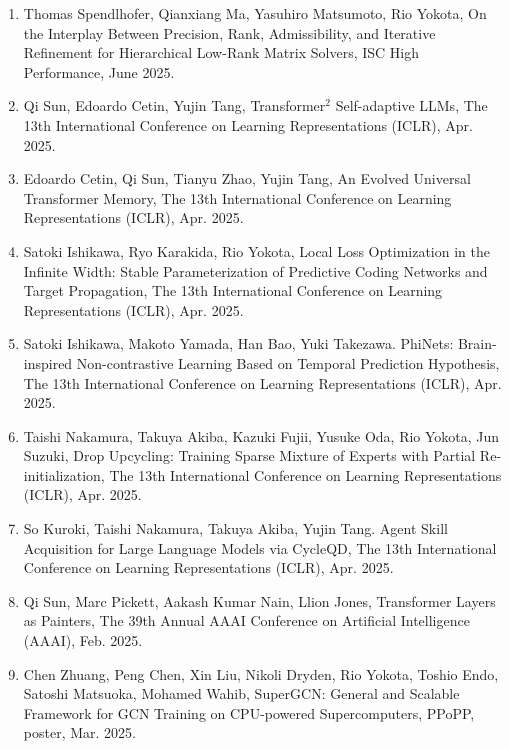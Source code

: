 \documentclass[margin,line]{cv}
\begin{document}
\begin{resume}
\begin{enumerate}
\item Thomas Spendlhofer, Qianxiang Ma, Yasuhiro Matsumoto, Rio Yokota, On the Interplay Between Precision, Rank, Admissibility, and Iterative Refinement for Hierarchical Low-Rank Matrix Solvers, ISC High Performance, June 2025.

\item Qi Sun, Edoardo Cetin, Yujin Tang, Transformer$^2$ Self-adaptive LLMs, The 13th International Conference on Learning Representations (ICLR), Apr. 2025.

\item Edoardo Cetin, Qi Sun, Tianyu Zhao, Yujin Tang, An Evolved Universal Transformer Memory, The 13th International Conference on Learning Representations (ICLR), Apr. 2025.

\item Satoki Ishikawa, Ryo Karakida, Rio Yokota, Local Loss Optimization in the Infinite Width: Stable Parameterization of Predictive Coding Networks and Target Propagation, The 13th International Conference on Learning Representations (ICLR), Apr. 2025.

\item Satoki Ishikawa, Makoto Yamada, Han Bao, Yuki Takezawa. PhiNets: Brain-inspired Non-contrastive Learning Based on Temporal Prediction Hypothesis, The 13th International Conference on Learning Representations (ICLR), Apr. 2025.

\item Taishi Nakamura, Takuya Akiba, Kazuki Fujii, Yusuke Oda, Rio Yokota, Jun Suzuki, Drop Upcycling: Training Sparse Mixture of Experts with Partial Re-initialization, The 13th International Conference on Learning Representations (ICLR), Apr. 2025.

\item So Kuroki, Taishi Nakamura, Takuya Akiba, Yujin Tang. Agent Skill Acquisition for Large Language Models via CycleQD, The 13th International Conference on Learning Representations (ICLR), Apr. 2025.

\item Qi Sun, Marc Pickett, Aakash Kumar Nain, Llion Jones, Transformer Layers as Painters, The 39th Annual AAAI Conference on Artificial Intelligence (AAAI), Feb. 2025.

\item Chen Zhuang, Peng Chen, Xin Liu, Nikoli Dryden, Rio Yokota, Toshio Endo, Satoshi Matsuoka, Mohamed Wahib, SuperGCN: General and Scalable Framework for GCN Training on CPU-powered Supercomputers, PPoPP, poster, Mar. 2025.


\end{enumerate}
\end{resume}
\end{document}
